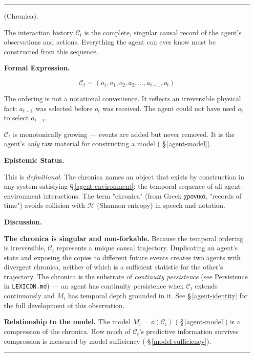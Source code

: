 \documentclass[11pt,oneside]{article}
\newcounter{claim}[section]
\renewcommand{\theclaim}{\thesection.\arabic{claim}}
\newenvironment{segment}[2]{%
  \refstepcounter{claim}%
  \bigskip\noindent\hrule\smallskip
  \noindent{\bfseries #1~\theclaim}\enskip(#2).\par\smallskip
  \noindent\ignorespaces
}{%
  \par\smallskip\noindent\hrule\bigskip
}
\newenvironment{definition}[1][]{\begin{segment}{Definition}{#1}}{\end{segment}}
\begin{document}
\begin{definition}[Chronica]
\label{chronica}
The interaction history $\mathcal C_t$ is the complete, singular causal record of the agent's observations and actions. Everything the agent can ever know must be constructed from this sequence.



\medskip\noindent\textbf{Formal Expression.}



$$\mathcal{C}_t = (o_1, a_1, o_2, a_2, \ldots, a_{t-1}, o_t)$$

The ordering is not a notational convenience. It reflects an irreversible physical fact: $a_{t-1}$ was selected before $o_t$ was received. The agent could not have used $o_t$ to select $a_{t-1}$.

$\mathcal C_t$ is monotonically growing — events are added but never removed. It is the agent's \textit{only} raw material for constructing a model ( \S\,\ref{agent-model}).


\medskip\noindent\textbf{Epistemic Status.}


This is \textit{definitional}. The chronica names an object that exists by construction in any system satisfying \S\,\ref{agent-environment}: the temporal sequence of all agent-environment interactions. The term "chronica" (from Greek χρονικά, "records of time") avoids collision with $\mathcal{H}$ (Shannon entropy) in speech and notation.


\medskip\noindent\textbf{Discussion.}


\textbf{The chronica is singular and non-forkable.} Because the temporal ordering is irreversible, $\mathcal C_t$ represents a unique causal trajectory. Duplicating an agent's state and exposing the copies to different future events creates two agents with divergent chronica, neither of which is a sufficient statistic for the other's trajectory. The chronica is the substrate of \textit{continuity persistence} (see Persistence in \texttt{LEXICON.md}) — an agent has continuity persistence when $\mathcal{C}_t$ extends continuously and $M_t$ has temporal depth grounded in it. See \S\,\ref{agent-identity} for the full development of this observation.

\textbf{Relationship to the model.} The model $M_t = \phi(\mathcal C_t)$ ( \S\,\ref{agent-model}) is a compression of the chronica. How much of $\mathcal C_t$'s predictive information survives compression is measured by model sufficiency ( \S\,\ref{model-sufficiency}).

\end{definition}
\end{document}
